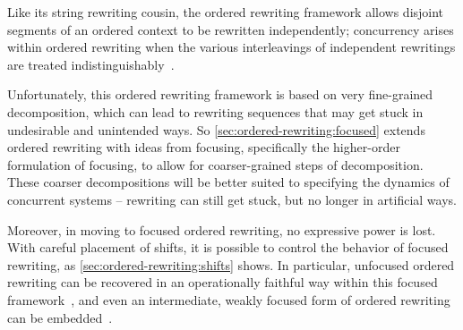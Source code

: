 Like its string rewriting cousin, the ordered rewriting framework allows disjoint segments of an ordered context to be rewritten independently;
concurrency arises within ordered rewriting when the various interleavings of independent rewritings are treated indistinguishably~.

Unfortunately, this ordered rewriting framework is based on very fine-grained decomposition, which can lead to rewriting sequences that may get stuck in undesirable and unintended ways.
So \cref{sec:ordered-rewriting:focused} extends ordered rewriting with ideas from focusing\autocite{Andreoli:JLC92}, specifically the higher-order formulation of focusing\autocites{Zeilberger:POPL08}{Simmons:CMU12}, to allow for coarser-grained steps of decomposition.
These coarser decompositions will be better suited to specifying the dynamics of concurrent systems -- rewriting can still get stuck, but no longer in artificial ways.

Moreover, in moving to focused ordered rewriting, no expressive power is lost.
With careful placement of shifts, it is possible to control the behavior of focused rewriting, as \cref{sec:ordered-rewriting:shifts} shows.
In particular, unfocused ordered rewriting can be recovered in an operationally faithful way within this focused framework~, and even an intermediate, weakly focused form of ordered rewriting can be embedded~.







